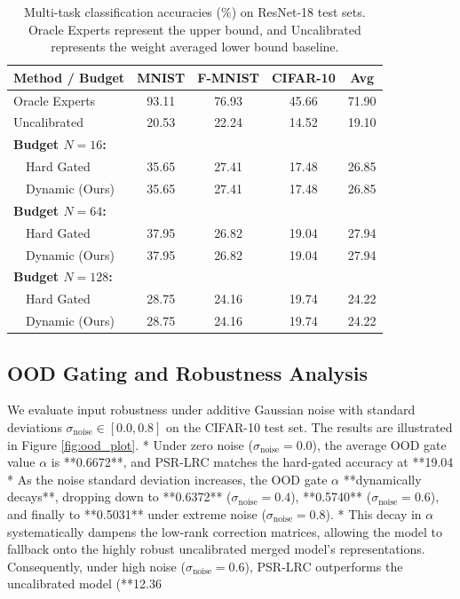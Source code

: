 \documentclass{article}
\theoremstyle{plain}
\theoremstyle{definition}
\theoremstyle{remark}
\begin{document}
\begin{table}[t]
\caption{Multi-task classification accuracies (\%) on ResNet-18 test sets. Oracle Experts represent the upper bound, and Uncalibrated represents the weight averaged lower bound baseline.}
\label{tab:results}
\vskip 0.05in
\begin{center}
\begin{small}
\begin{sc}
\begin{tabular}{lcccc}
\toprule
Method / Budget & MNIST & F-MNIST & CIFAR-10 & Avg \\
\midrule
Oracle Experts & 93.11 & 76.93 & 45.66 & 71.90 \\
Uncalibrated   & 20.53 & 22.24 & 14.52 & 19.10 \\
\midrule
\textbf{Budget $N = 16$:} \\
\ \ Hard Gated  & 35.65 & 27.41 & 17.48 & 26.85 \\
\ \ Dynamic (Ours)& 35.65 & 27.41 & 17.48 & 26.85 \\
\midrule
\textbf{Budget $N = 64$:} \\
\ \ Hard Gated  & 37.95 & 26.82 & 19.04 & 27.94 \\
\ \ Dynamic (Ours)& 37.95 & 26.82 & 19.04 & 27.94 \\
\midrule
\textbf{Budget $N = 128$:} \\
\ \ Hard Gated  & 28.75 & 24.16 & 19.74 & 24.22 \\
\ \ Dynamic (Ours)& 28.75 & 24.16 & 19.74 & 24.22 \\
\bottomrule
\end{tabular}
\end{sc}
\end{small}
\end{center}
\vskip -0.1in
\end{table}

\subsection{OOD Gating and Robustness Analysis}
We evaluate input robustness under additive Gaussian noise with standard deviations $\sigma_{\text{noise}} \in [0.0, 0.8]$ on the CIFAR-10 test set. The results are illustrated in Figure \ref{fig:ood_plot}.
*   Under zero noise ($\sigma_{\text{noise}} = 0.0$), the average OOD gate value $\alpha$ is **0.6672**, and PSR-LRC matches the hard-gated accuracy at **19.04%
*   As the noise standard deviation increases, the OOD gate $\alpha$ **dynamically decays**, dropping down to **0.6372** ($\sigma_{\text{noise}} = 0.4$), **0.5740** ($\sigma_{\text{noise}} = 0.6$), and finally to **0.5031** under extreme noise ($\sigma_{\text{noise}} = 0.8$).
*   This decay in $\alpha$ systematically dampens the low-rank correction matrices, allowing the model to fallback onto the highly robust uncalibrated merged model's representations. Consequently, under high noise ($\sigma_{\text{noise}} = 0.6$), PSR-LRC outperforms the uncalibrated model (**12.36%
\end{document}
